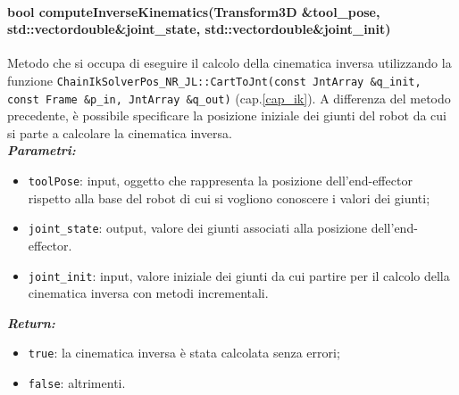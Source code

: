 \paragraph{bool computeInverseKinematics(Transform3D \&tool\_pose, std::vector\tl double\tr \&joint\_state, std::vector\tl double\tr \&joint\_init)}
Metodo che si occupa di eseguire il calcolo della cinematica inversa utilizzando la funzione \texttt{ChainIkSolverPos\_NR\_JL::CartToJnt(const JntArray \&q\_init, const Frame \&p\_in, JntArray \&q\_out)} (cap.\ref{cap_ik}). A differenza del metodo precedente, è possibile specificare la posizione iniziale dei giunti del robot da cui si parte a calcolare la cinematica inversa. \\
\textbf{\textit{Parametri:}}
\begin{itemize}
	\item \texttt{toolPose}: input, oggetto che rappresenta la posizione dell'end-effector rispetto alla base del robot di cui si vogliono conoscere i valori dei giunti;
	\item \texttt{joint\_state}: output, valore dei giunti associati alla posizione dell'end-effector.
	\item \texttt{joint\_init}: input, valore iniziale dei giunti da cui partire per il calcolo della cinematica inversa con metodi incrementali.
\end{itemize}
\textbf{\textit{Return:}}
\begin{itemize}
	\item \texttt{true}: la cinematica inversa è stata calcolata senza errori;
	\item \texttt{false}: altrimenti.
\end{itemize}


